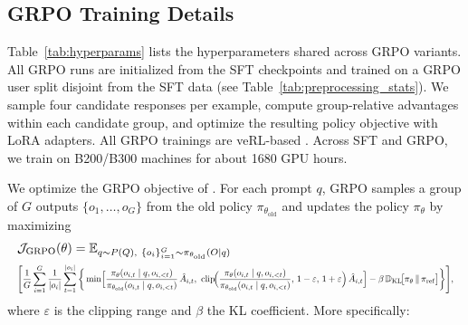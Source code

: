 \documentclass[11pt]{article}
\begin{document}
\subsection{GRPO Training Details}
\label{app:grpo_training_details}

Table~\ref{tab:hyperparams} lists the hyperparameters shared across GRPO variants. All GRPO runs are initialized from the SFT checkpoints and trained on a GRPO user split disjoint from the SFT data (see Table~\ref{tab:preprocessing_stats}). We sample four candidate responses per example, compute group-relative advantages within each candidate group, and optimize the resulting policy objective with LoRA adapters. All GRPO trainings are veRL-based \citep{verl}. Across SFT and GRPO, we train on B200/B300 machines for about 1680 GPU hours.

We optimize the GRPO objective of \citet{shao2024deepseekmath}. For each prompt $q$, GRPO samples a group of $G$ outputs $\{o_1,\dots,o_G\}$ from the old policy $\pi_{\theta_{\mathrm{old}}}$ and updates the policy $\pi_\theta$ by maximizing
\begin{equation*}
\begin{aligned}
&\mathcal{J}_{\mathrm{GRPO}}(\theta) = \mathbb{E}_{q \sim P(Q),\ \{o_i\}_{i=1}^{G} \sim \pi_{\theta_{\mathrm{old}}}(O \mid q)} \\
&\resizebox{\linewidth}{!}{$\Bigg[ \displaystyle \frac{1}{G}\sum_{i=1}^{G}\frac{1}{|o_i|}\sum_{t=1}^{|o_i|}\bigg\{ \min\!\Big[ \frac{\pi_\theta(o_{i,t}\mid q,o_{i,<t})}{\pi_{\theta_{\mathrm{old}}}(o_{i,t}\mid q,o_{i,<t})}\,\hat{A}_{i,t},\ \mathrm{clip}\!\Big(\frac{\pi_\theta(o_{i,t}\mid q,o_{i,<t})}{\pi_{\theta_{\mathrm{old}}}(o_{i,t}\mid q,o_{i,<t})},\, 1-\varepsilon,\, 1+\varepsilon\Big)\,\hat{A}_{i,t} \Big] - \beta\, \mathbb{D}_{\mathrm{KL}}\!\big[\pi_\theta \,\|\, \pi_{\mathrm{ref}}\big] \bigg\}\Bigg] ,$}
\end{aligned}
\end{equation*}
where $\varepsilon$ is the clipping range and $\beta$ the KL coefficient. More specifically:
\end{document}
